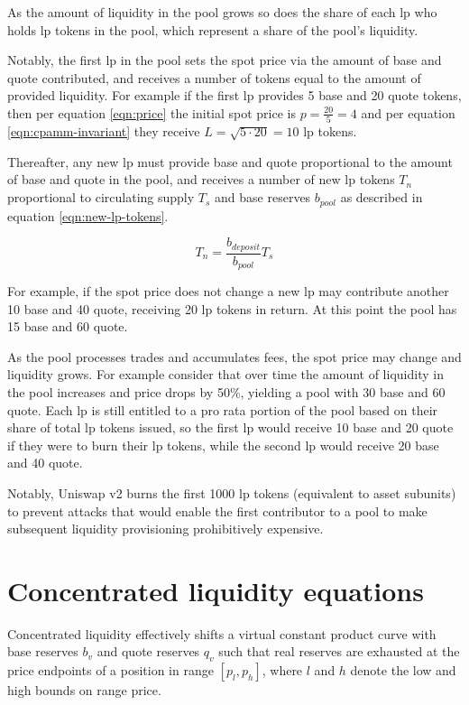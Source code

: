 \documentclass[table, twocolumn]{article}
\begin{document}
As the amount of liquidity in the pool grows so does the share of each \gls{lp} who holds \gls{lp}
tokens in the pool, which represent a share of the pool's liquidity.

Notably, the first \gls{lp} in the pool sets the spot price via the amount of base and quote
contributed, and receives a number of tokens equal to the amount of provided liquidity. For example
if the first \gls{lp} provides 5 base and 20 quote tokens, then per equation \ref{eqn:price} the initial spot price is $p = \frac{20}{5} = 4$ and per equation \ref{eqn:cpamm-invariant} they receive
$L = \sqrt{5 \cdot 20} = 10$ \gls{lp} tokens.

Thereafter, any new \gls{lp} must provide base and quote proportional to the amount of base and
quote in the pool, and receives a number of new \gls{lp} tokens $T_n$ proportional to circulating
supply $T_s$ and base reserves $b_{pool}$ as described in equation \ref{eqn:new-lp-tokens}.

\begin{equation} \label{eqn:new-lp-tokens}
  T_n = \frac{b_{deposit}}{b_{pool}} T_s
\end{equation}

For example, if the spot price does not change a new \gls{lp} may contribute another 10 base and 40
quote, receiving 20 \gls{lp} tokens in return. At this point the pool has 15 base and 60 quote.

As the pool processes trades and accumulates fees, the spot price may change and liquidity grows.
For example consider that over time the amount of liquidity in the pool increases and price drops by
50\%, yielding a pool with 30 base and 60 quote. Each \gls{lp} is still entitled to a pro rata
portion of the pool based on their share of total \gls{lp} tokens issued, so the first \gls{lp}
would receive 10 base and 20 quote if they were to burn their \gls{lp} tokens, while the second
\gls{lp} would receive 20 base and 40 quote.

Notably, Uniswap v2 burns the first 1000 \gls{lp} tokens (equivalent to asset subunits) to prevent
attacks that would enable the first contributor to a pool to make subsequent liquidity provisioning
prohibitively expensive.

\section{Concentrated liquidity equations}

Concentrated liquidity effectively shifts a virtual constant product curve with base reserves $b_v$
and quote reserves $q_v$ such that real reserves are exhausted at the price endpoints of a position
in range $[p_l, p_h]$, where $l$ and $h$ denote the low and high bounds on range price.
\end{document}
